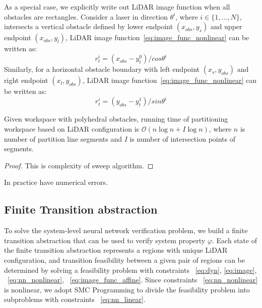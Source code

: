 As a special case, we explicitly write out LiDAR image function when all obstacles are rectangles. 
Consider a laser in direction $\theta^i$, where $i \in \{1, ..., N\}$, intersects a vertical obstacle 
defined by lower endpoint $(x_{obs}, y_{s})$ and upper endpoint $(x_{obs}, y_{l})$, 
LiDAR image function~\eqref{eq:image_func_nonlinear} can be written as:
\begin{equation}
    \label{eq:vertical}
    r_t^i = (x_{obs} - y_t^0) / cos \theta^i
\end{equation}
Similarly, for a horizontal obstacle boundary with left endpoint $(x_{s}, y_{obs})$ and right endpoint $(x_{l}, y_{obs})$,
LiDAR image function~\eqref{eq:image_func_nonlinear} can be written as:
\begin{equation} 
    \label{eq:horizontal}
    r_t^i = (y_{obs} - y_t^1) / sin \theta^i
\end{equation}


\begin{theorem}
    Given workspace with polyhedral obstacles, running time of partitioning workspace based on LiDAR configuration is
    $\mathcal{O}(n\log{}n + I\log{}n)$, where $n$ is number of partition line segments 
    and $I$ is number of intersection points of segments.
    \begin{proof}
        {\color{blue} This is complexity of sweep algorithm.} 
    \end{proof}
\end{theorem}    

{\color{blue} In practice have numerical errors.}




\subsection{Finite Transition abstraction}

To solve the system-level neural network verification problem, 
we build a finite transition abstraction that can be used to verify system property $\varphi$.
Each state of the finite transition abstraction represents a regions with unique LiDAR configuration,
and transition feasibility between a given pair of regions can be determined by solving a feasibility problem 
with constraints ~\eqref{eq:dyn}, \eqref{eq:image}, ~\eqref{eq:nn_nonlinear}, ~\eqref{eq:image_func_affine}.
Since constraints ~\eqref{eq:nn_nonlinear} is nonlinear, we adopt SMC Programming to
divide the feasibility problem into subproblems with constraints ~\eqref{eq:nn_linear}.



